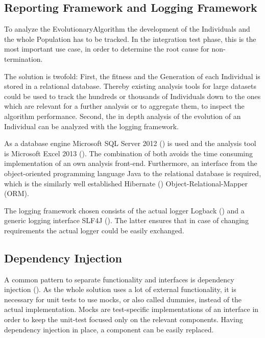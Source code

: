 \subsection{Reporting Framework and Logging Framework}\label{subsecReportingFrameworkAndLoggingFramework}

To analyze the \gls{EvolutionaryAlgorithm} the development of the \glspl{Individual} and the whole \gls{Population} has to be tracked. In the integration test phase, this is the most important use case, in order to determine the root cause for non-termination.

The solution is twofold: First, the fitness and the \gls{Generation} of each \gls{Individual} is stored in a relational database. Thereby existing analysis tools for large datasets could be used to track the hundreds or thousands of \glspl{Individual} down to the ones which are relevant for a further analysis or to aggregate them, to inspect the algorithm performance. Second, the in depth analysis of the evolution of an \gls{Individual} can be analyzed with the logging framework.

As a database engine Microsoft SQL Server 2012 (\cite{Microsoft}) is used and the analysis tool is Microsoft Excel 2013 (\cite{Microsofta}). The combination of both avoids the time consuming implementation of an own analysis front-end. Furthermore, an interface from the object-oriented programming language Java to the relational database is required, which is the similarly well established Hibernate (\cite{JBossCommunity}) Object-Relational-Mapper (ORM).

The logging framework chosen consists of the actual logger Logback (\cite{QualityOpenSoftwarea}) and a generic logging interface SLF4J (\cite{QualityOpenSoftware}). The latter ensures that in case of changing requirements the actual logger could be easily exchanged.

\subsection{Dependency Injection}

A common pattern to separate functionality and interfaces is dependency injection (\cite{Knauß}). As the whole solution uses a lot of external functionality, it is necessary for unit tests to use mocks, or also called dummies, instead of the actual implementation. Mocks are test-specific implementations of an interface in order to keep the unit-test focused only on the relevant components. Having dependency injection in place, a component can be easily replaced.
 
